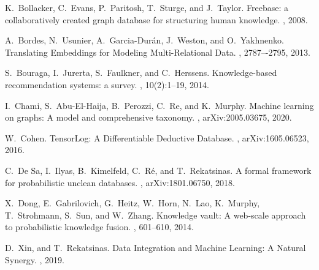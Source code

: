 \documentclass[11pt]{article}
\begin{document}
\begin{thebibliography}{10}
\itemsep=1pt
\begin{small}


 K.~Bollacker, C.~Evans, P.~Paritosh, T.~Sturge, and J.~Taylor. \newblock Freebase: a collaboratively created graph database for structuring human knowledge. , 2008.

 A.~Bordes, N.~Usunier, A.~Garcia-Dur\'{a}n, J.~Weston, and O.~Yakhnenko. \newblock Translating Embeddings for Modeling Multi-Relational Data. , 2787–-2795, 2013.

 S.~Bouraga, I.~Jurerta, S.~Faulkner, and C.~Herssens. \newblock Knowledge-based recommendation systems: a survey. , 10(2):1--19, 2014.


 I.~Chami, S.~Abu-El-Haija, B.~Perozzi, C.~Re, and K.~Murphy. \newblock Machine learning on graphs: A model and comprehensive taxonomy. , arXiv:2005.03675, 2020.

 W.~Cohen. \newblock TensorLog: {A} Differentiable Deductive Database. , arXiv:1605.06523, 2016.

 C.~De Sa, I.~Ilyas, B.~Kimelfeld, C.~R{\'e}, and T.~Rekatsinas. \newblock A formal framework for probabilistic unclean databases. , arXiv:1801.06750, 2018.

 X.~Dong, E.~Gabrilovich, G.~Heitz, W.~Horn, N.~Lao, K.~Murphy, T.~Strohmann, S.~Sun, and W.~Zhang. \newblock Knowledge vault: A web-scale approach to probabilistic knowledge fusion. , 601--610, 2014.

 D.~Xin, and T.~Rekatsinas. \newblock Data Integration and Machine Learning: A Natural Synergy. , 2019.


\end{small}
\end{thebibliography}
\end{document}
